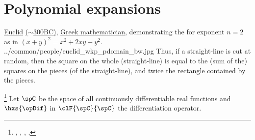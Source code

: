 \section{Polynomial expansions}
\qboxnps
  {\href{http://en.wikipedia.org/wiki/Euclid}{Euclid}
   \href{http://www-history.mcs.st-andrews.ac.uk/Timelines/TimelineA.html}{($\sim$300BC)},
   \href{http://www-history.mcs.st-andrews.ac.uk/BirthplaceMaps/Places/Greece.html}{Greek mathematician},
   demonstrating the  for exponent $n=2$ as in $(x+y)^2=x^2 + 2xy + y^2$.
    \footnotemark
  }
  {../common/people/euclid_wkp_pdomain_bw.jpg}
  {Thus, if a straight-line is cut at random, 
   then the square on the whole (straight-line) is equal to
   the (sum of the) squares on the pieces (of the straight-line), 
   and twice the rectangle contained by the pieces.}


\begin{theorem}
\footnote{
  ,
  ,
  ,
  ,
  }
\label{thm:taylor}
Let $\spC$ be the space of all continuously differentiable real functions
and $\hxs{\opDif}$ in $\clF{\spC}{\spC}$ the differentiation operator. 
\end{theorem}



